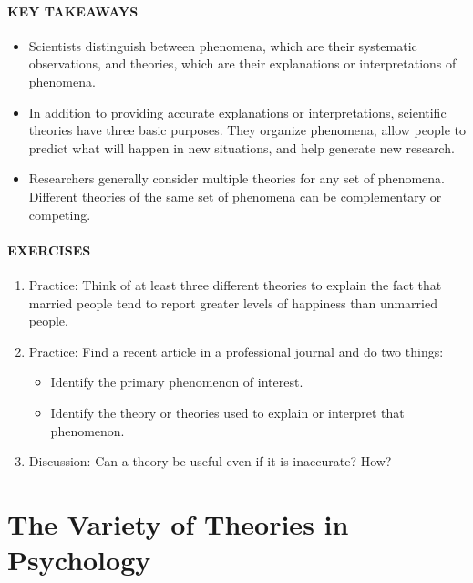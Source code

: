 \documentclass[
]{krantz}
\providecommand{\tightlist}{%
  \setlength{\itemsep}{0pt}\setlength{\parskip}{0pt}}
\begin{document}
\hypertarget{key-takeaways-6}{%
\paragraph*{KEY TAKEAWAYS}\label{key-takeaways-6}}

\begin{itemize}
\tightlist
\item
  Scientists distinguish between phenomena, which are their systematic observations, and theories, which are their explanations or interpretations of phenomena.
\item
  In addition to providing accurate explanations or interpretations, scientific theories have three basic purposes. They organize phenomena, allow people to predict what will happen in new situations, and help generate new research.
\item
  Researchers generally consider multiple theories for any set of phenomena. Different theories of the same set of phenomena can be complementary or competing.
\end{itemize}

\hypertarget{exercises-5}{%
\paragraph*{EXERCISES}\label{exercises-5}}

\begin{enumerate}
\def\labelenumi{\arabic{enumi}.}
\tightlist
\item
  Practice: Think of at least three different theories to explain the fact that married people tend to report greater levels of happiness than unmarried people.
\item
  Practice: Find a recent article in a professional journal and do two things:

  \begin{itemize}
  \tightlist
  \item
    Identify the primary phenomenon of interest.
  \item
    Identify the theory or theories used to explain or interpret that phenomenon.
  \end{itemize}
\item
  Discussion: Can a theory be useful even if it is inaccurate? How?
\end{enumerate}

\hypertarget{the-variety-of-theories-in-psychology}{%
\section{The Variety of Theories in Psychology}\label{the-variety-of-theories-in-psychology}}
\end{document}
